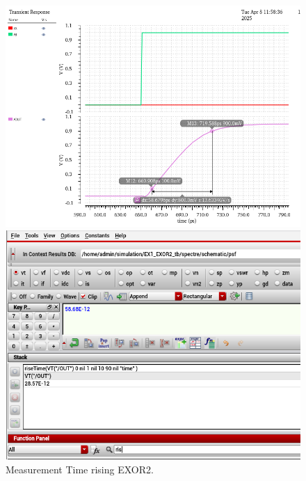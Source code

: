 \begin{figure}[H]
	\begin{minipage}{0.5\linewidth}
		\includegraphics[width=\linewidth]{section/EX1/EXOR/EX1_EXOR2_Tr_Waveform.png}
	\end{minipage}
	\begin{minipage}{0.5\linewidth}
		\includegraphics[width=\linewidth]{section/EX1/EXOR/EX1_EXOR2_Tr_Cal.png}
	\end{minipage}
	\caption{Measurement Time rising EXOR2.}
\end{figure}


